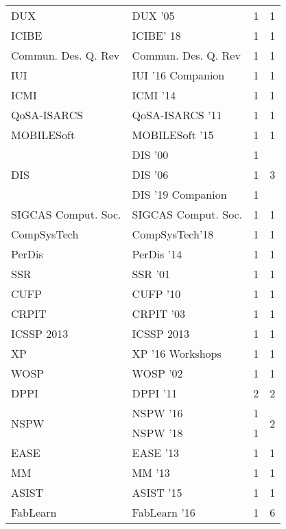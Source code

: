 \begin{table*}[t]
\begin{tabular}{llrr}
\multirow{1}{*}{DUX } & DUX '05 & 1 & \multirow{1}{*}{1}\\
\multirow{1}{*}{ICIBE} & ICIBE' 18 & 1 & \multirow{1}{*}{1}\\
\multirow{1}{*}{Commun. Des. Q. Rev} & Commun. Des. Q. Rev & 1 & \multirow{1}{*}{1}\\
\multirow{1}{*}{IUI } & IUI '16 Companion & 1 & \multirow{1}{*}{1}\\
\multirow{1}{*}{ICMI } & ICMI '14 & 1 & \multirow{1}{*}{1}\\
\multirow{1}{*}{QoSA-ISARCS } & QoSA-ISARCS '11 & 1 & \multirow{1}{*}{1}\\
\multirow{1}{*}{MOBILESoft } & MOBILESoft '15 & 1 & \multirow{1}{*}{1}\\
\multirow{3}{*}{DIS } & DIS '00 & 1 & \multirow{3}{*}{3}\\
& DIS '06 & 1 &\\
& DIS '19 Companion & 1 &\\
\multirow{1}{*}{SIGCAS Comput. Soc.} & SIGCAS Comput. Soc. & 1 & \multirow{1}{*}{1}\\
\multirow{1}{*}{CompSysTech} & CompSysTech'18 & 1 & \multirow{1}{*}{1}\\
\multirow{1}{*}{PerDis } & PerDis '14 & 1 & \multirow{1}{*}{1}\\
\multirow{1}{*}{SSR } & SSR '01 & 1 & \multirow{1}{*}{1}\\
\multirow{1}{*}{CUFP } & CUFP '10 & 1 & \multirow{1}{*}{1}\\
\multirow{1}{*}{CRPIT } & CRPIT '03 & 1 & \multirow{1}{*}{1}\\
\multirow{1}{*}{ICSSP 2013} & ICSSP 2013 & 1 & \multirow{1}{*}{1}\\
\multirow{1}{*}{XP } & XP '16 Workshops & 1 & \multirow{1}{*}{1}\\
\multirow{1}{*}{WOSP } & WOSP '02 & 1 & \multirow{1}{*}{1}\\
\multirow{1}{*}{DPPI } & DPPI '11 & 2 & \multirow{1}{*}{2}\\
\multirow{2}{*}{NSPW } & NSPW '16 & 1 & \multirow{2}{*}{2}\\
& NSPW '18 & 1 &\\
\multirow{1}{*}{EASE } & EASE '13 & 1 & \multirow{1}{*}{1}\\
\multirow{1}{*}{MM } & MM '13 & 1 & \multirow{1}{*}{1}\\
\multirow{1}{*}{ASIST } & ASIST '15 & 1 & \multirow{1}{*}{1}\\
\multirow{2}{*}{FabLearn } & FabLearn '16 & 1 & \multirow{2}{*}{6}\\

\end{tabular}
\end{table*}
